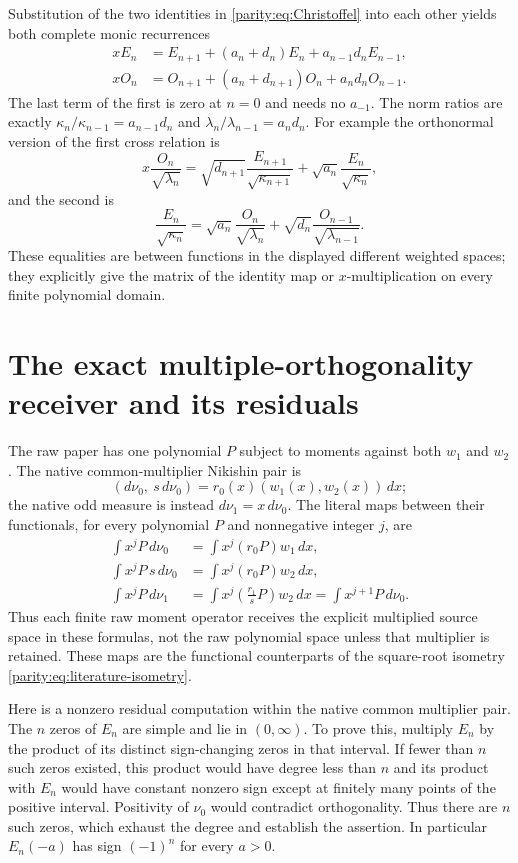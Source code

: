 \documentclass[11pt]{article}
\begin{document}
Substitution of the two identities in \eqref{parity:eq:Christoffel} into
each other yields both complete monic recurrences
\begin{align}
 xE_n&=E_{n+1}+(a_n+d_n)E_n+a_{n-1}d_nE_{n-1},\label{parity:eq:E-rec}\\
 xO_n&=O_{n+1}+(a_n+d_{n+1})O_n+a_nd_nO_{n-1}.\label{parity:eq:O-rec}
\end{align}
The last term of the first is zero at $n=0$ and needs no $a_{-1}$.
The norm ratios are exactly
$\kappa_n/\kappa_{n-1}=a_{n-1}d_n$ and
$\lambda_n/\lambda_{n-1}=a_nd_n$.
For example the orthonormal version of the first cross relation is
\[
 x\frac{O_n}{\sqrt{\lambda_n}}
  =\sqrt{d_{n+1}}\frac{E_{n+1}}{\sqrt{\kappa_{n+1}}}
       +\sqrt{a_n}\frac{E_n}{\sqrt{\kappa_n}},
\]
and the second is
\[
 \frac{E_n}{\sqrt{\kappa_n}}
 =\sqrt{a_n}\frac{O_n}{\sqrt{\lambda_n}}
       +\sqrt{d_n}\frac{O_{n-1}}{\sqrt{\lambda_{n-1}}}.
\]
These equalities are between functions in the displayed different
weighted spaces; they explicitly give the matrix of the identity
map or $x$-multiplication on every finite polynomial domain.

\section{The exact multiple-orthogonality receiver and its residuals}

The raw paper has one polynomial $P$ subject to moments against
both $w_1$ and $w_2$. The native common-multiplier Nikishin pair is
\[
 (d\nu_0,\ s\,d\nu_0)=r_0(x)(w_1(x),w_2(x))\,dx;
\]
the native odd measure is instead $d\nu_1=x\,d\nu_0$.
The literal maps between their functionals, for every polynomial
$P$ and nonnegative integer $j$, are
\begin{align}
 \int x^jP\,d\nu_0&=\int x^j(r_0P)w_1\,dx,\label{parity:eq:functional0}\\
 \int x^jP\,s\,d\nu_0&=\int x^j(r_0P)w_2\,dx,\label{parity:eq:functionalS}\\
 \int x^jP\,d\nu_1&=\int x^j\left(\frac{r_1}{s}P\right)w_2\,dx
                    =\int x^{j+1}P\,d\nu_0.\label{parity:eq:functional1}
\end{align}
Thus each finite raw moment operator receives the explicit
multiplied source space in these formulas, not the raw polynomial
space unless that multiplier is retained. These maps are the
functional counterparts of the square-root isometry
\eqref{parity:eq:literature-isometry}.

Here is a nonzero residual computation within the native common
multiplier pair. The $n$ zeros of $E_n$ are simple and lie in
$(0,\infty)$. To prove this, multiply $E_n$ by the product of its
distinct sign-changing zeros in that interval. If fewer than $n$
such zeros existed, this product would have degree less than $n$
and its product with $E_n$ would have constant nonzero sign except
at finitely many points of the positive interval. Positivity of
$\nu_0$ would contradict orthogonality. Thus there are $n$ such
zeros, which exhaust the degree and establish the assertion.
In particular $E_n(-a)$ has sign $(-1)^n$ for every $a>0$.
\end{document}
